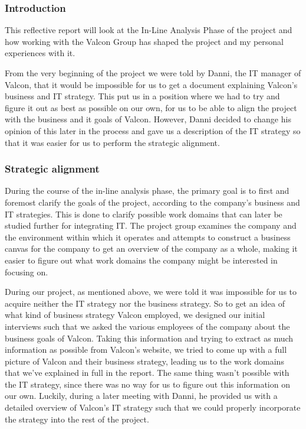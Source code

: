 \subsubsection*{Introduction}
This reflective report will look at the In-Line Analysis Phase of the project and how working with the Valcon Group has shaped the project and my personal experiences with it.

From the very beginning of the project we were told by Danni, the IT manager of Valcon, that it would be impossible for us to get a document explaining Valcon’s business and IT strategy. This put us in a position where we had to try and figure it out as best as possible on our own, for us to be able to align the project with the business and it goals of Valcon.
However, Danni decided to change his opinion of this later in the process and gave us a description of the IT strategy so that it was easier for us to perform the strategic alignment.

\subsubsection*{Strategic alignment}
During the course of the in-line analysis phase, the primary goal  is to first and foremost clarify the goals of the project, according to the company’s business and IT strategies. This is done to clarify possible work domains that can later be studied further for integrating IT. The project group examines the company and the environment within which it operates and attempts to construct a business canvas for the company to get an overview of the company as a whole, making it easier to figure out what work domains the company might be interested in focusing on.

During our project, as mentioned above, we were told it was impossible for us to acquire neither the IT strategy nor the business strategy. So to get an idea of what kind of business strategy Valcon employed, we designed our initial interviews such that we asked the various employees of the company about the business goals of Valcon. Taking this information and trying to extract as much information as possible from Valcon’s website, we tried to come up with a full picture of Valcon and their business strategy, leading us to the work domains that we’ve explained in full in the report.
The same thing wasn’t possible with the IT strategy, since there was no way for us to figure out this information on our own. Luckily, during a later meeting with Danni, he provided us with a detailed overview of Valcon’s IT strategy such that we could properly incorporate the strategy into the rest of the project.


